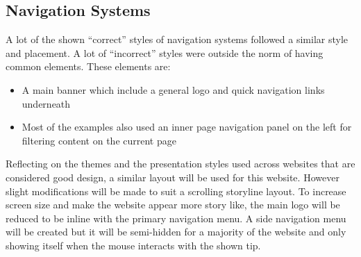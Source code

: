 \subsection{Navigation Systems}
A lot of the shown ``correct'' styles of navigation systems followed a similar style and placement. A lot of ``incorrect'' styles were outside the norm of having common elements. These elements are:
\begin{itemize}
	\item A main banner which include a general logo and quick navigation links underneath
	\item Most of the examples also used an inner page navigation panel on the left for filtering content on the current page	
\end{itemize}\vspace{1em}
Reflecting on the themes and the presentation styles used across websites that are considered good design, a similar layout will be used for this website. However slight modifications will be made to suit a scrolling storyline layout. To increase screen size and make the website appear more story like, the main logo will be reduced to be inline with the primary navigation menu. A side navigation menu will be created but it will be semi-hidden for a majority of the website and only showing itself when the mouse interacts with the shown tip.


